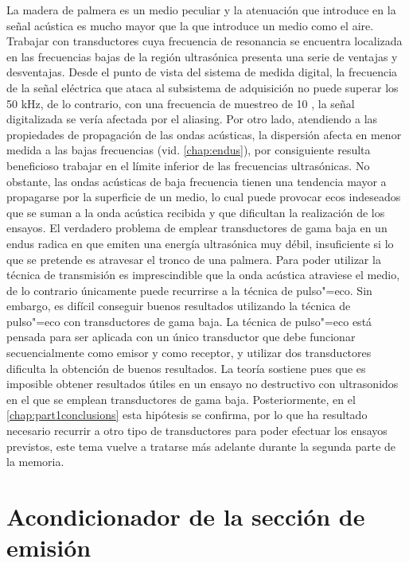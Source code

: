 La madera de palmera es un medio peculiar y la atenuación que introduce en
la señal acústica es mucho mayor que la que introduce un medio como el
aire. Trabajar con transductores cuya frecuencia de resonancia se encuentra
localizada en las frecuencias bajas de la región ultrasónica presenta una
serie de ventajas y desventajas. Desde el punto de vista del sistema de
medida digital, la frecuencia de la señal eléctrica que ataca al subsistema
de adquisición no puede superar los 50 kHz, de lo contrario, con una
frecuencia de muestreo de 10 \kms{}, la señal digitalizada se vería
afectada por el aliasing. Por otro lado, atendiendo a las propiedades de
propagación de las ondas acústicas, la dispersión afecta en menor medida a
las bajas frecuencias (vid. \cref{chap:endus}), por consiguiente resulta
beneficioso trabajar en el límite inferior de las frecuencias ultrasónicas.
No obstante, las ondas acústicas de baja frecuencia tienen una tendencia
mayor a propagarse por la superficie de un medio, lo cual puede provocar
ecos indeseados que se suman a la onda acústica recibida y que dificultan
la realización de los ensayos. El verdadero problema de emplear
transductores de gama baja en un endus radica en que emiten una energía
ultrasónica muy débil, insuficiente si lo que se pretende es atravesar el
tronco de una palmera. Para poder utilizar la técnica de transmisión es
imprescindible que la onda acústica atraviese el medio, de lo contrario
únicamente puede recurrirse a la técnica de pulso"=eco. Sin embargo, es
difícil conseguir buenos resultados utilizando la técnica de pulso"=eco con
transductores de gama baja. La técnica de pulso"=eco está pensada para ser
aplicada con un único transductor que debe funcionar secuencialmente como
emisor y como receptor, y utilizar dos transductores dificulta la obtención
de buenos resultados. La teoría sostiene pues que es imposible obtener
resultados útiles en un ensayo no destructivo con ultrasonidos en el que se
emplean transductores de gama baja. Posteriormente, en el
\cref{chap:part1conclusions} esta hipótesis se confirma, por lo que ha
resultado necesario recurrir a otro tipo de transductores para poder
efectuar los ensayos previstos, este tema vuelve a tratarse más adelante
durante la segunda parte de la memoria.


\section{Acondicionador de la sección de emisión}

